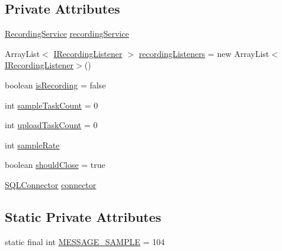 \subsection*{Private Attributes}
\begin{DoxyCompactItemize}
\item 
\hyperlink{classcom_1_1qualoutdoor_1_1recorder_1_1recording_1_1RecordingService}{Recording\-Service} \hyperlink{classcom_1_1qualoutdoor_1_1recorder_1_1recording_1_1RecordingHandler_a0fd9f14da8697f982103fdde7a6478f6}{recording\-Service}
\item 
Array\-List$<$ \hyperlink{interfacecom_1_1qualoutdoor_1_1recorder_1_1recording_1_1IRecordingListener}{I\-Recording\-Listener} $>$ \hyperlink{classcom_1_1qualoutdoor_1_1recorder_1_1recording_1_1RecordingHandler_a4fa68c1a53c3c122b41ef26bbac86fb0}{recording\-Listeners} = new Array\-List$<$\hyperlink{interfacecom_1_1qualoutdoor_1_1recorder_1_1recording_1_1IRecordingListener}{I\-Recording\-Listener}$>$()
\item 
boolean \hyperlink{classcom_1_1qualoutdoor_1_1recorder_1_1recording_1_1RecordingHandler_a9dce0427fbb06ac60b6431a3c57f73ca}{is\-Recording} = false
\item 
int \hyperlink{classcom_1_1qualoutdoor_1_1recorder_1_1recording_1_1RecordingHandler_a80d3016579fbb54ff9b82e05a7819080}{sample\-Task\-Count} = 0
\item 
int \hyperlink{classcom_1_1qualoutdoor_1_1recorder_1_1recording_1_1RecordingHandler_ab19d014f145253334e05e1aa971fba02}{upload\-Task\-Count} = 0
\item 
int \hyperlink{classcom_1_1qualoutdoor_1_1recorder_1_1recording_1_1RecordingHandler_ada90cb2be34fabadd3ba906554dff109}{sample\-Rate}
\item 
boolean \hyperlink{classcom_1_1qualoutdoor_1_1recorder_1_1recording_1_1RecordingHandler_a14b87c5095adb1269d16fe694206b5c7}{should\-Close} = true
\item 
\hyperlink{classcom_1_1qualoutdoor_1_1recorder_1_1persistent_1_1SQLConnector}{S\-Q\-L\-Connector} \hyperlink{classcom_1_1qualoutdoor_1_1recorder_1_1recording_1_1RecordingHandler_a6121c72df3dff228ecb8031aa1fb56c9}{connector}
\end{DoxyCompactItemize}
\subsection*{Static Private Attributes}
\begin{DoxyCompactItemize}
\item 
static final int \hyperlink{classcom_1_1qualoutdoor_1_1recorder_1_1recording_1_1RecordingHandler_a11cfd8967387855a54214ec0eaeeb372}{M\-E\-S\-S\-A\-G\-E\-\_\-\-S\-A\-M\-P\-L\-E} = 104
\end{DoxyCompactItemize}


